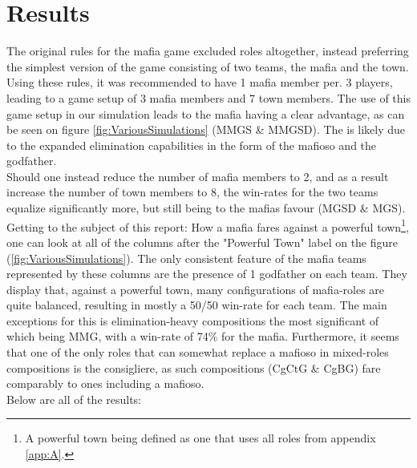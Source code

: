 \section{Results}\label{sec:results}
The original rules for the mafia game excluded roles altogether, instead
preferring the simplest version of the game consisting of two teams, the mafia
and the town. Using these rules\cite{MafiaRules}, it was recommended to have 1
mafia member per. 3 players, leading to a game setup of 3 mafia members and 7
town members. The use of this game setup in our simulation leads to the mafia
having a clear advantage, as can be seen on figure \ref{fig:VariousSimulations}
(MMGS \& MMGSD). The is likely due to the
expanded elimination capabilities in the form of the mafioso and the godfather.
\\ Should one instead reduce the number of mafia members to 2, and as a result
increase the number of town members to 8, the win-rates for the two teams
equalize significantly more, but still being to the mafias favour (MGSD \&
MGS).\\ Getting to the subject of this report: How a mafia fares against a
powerful town\footnote{A powerful town being defined as one that uses all roles
    from appendix \ref{app:A}.}, one can look at all of the columns after the
"Powerful Town" label on the figure (\ref{fig:VariousSimulations}). The only
consistent feature of the mafia teams represented by these columns are the
presence of 1 godfather on each team. They display that, against a powerful
town, many configurations of mafia-roles are quite balanced, resulting in
mostly a 50/50 win-rate for each team. The main exceptions for this is
elimination-heavy compositions the most significant of which being MMG, with a
win-rate of 74\% for the mafia. Furthermore, it seems that one of the only
roles that can somewhat replace a mafioso in mixed-roles compositions is the
consigliere, as such compositions (CgCtG \& CgBG) fare comparably to ones
including a mafioso. \\ Below are all of the results:
